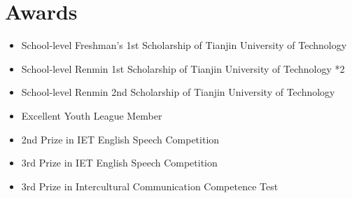 \documentclass{article}
\begin{document}
\section{Awards}
\begin{itemize}
\item School-level Freshman’s 1st Scholarship of Tianjin University of Technology
\item School-level Renmin 1st Scholarship of Tianjin University of Technology *2
\item School-level Renmin 2nd Scholarship of Tianjin University of Technology
\item Excellent Youth League Member
\item 2nd Prize in IET English Speech Competition
\item 3rd Prize in IET English Speech Competition
\item 3rd Prize in Intercultural Communication Competence Test
\end{itemize}
\end{document}
